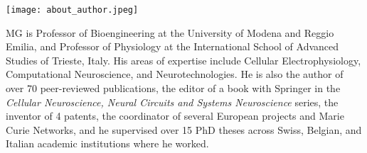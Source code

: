 %


\begin{center}
\texttt{[image: about\_author.jpeg]}
\end{center}	

	
	MG is Professor of Bioengineering at the University of Modena and Reggio Emilia, and Professor of Physiology at the International School of Advanced Studies of Trieste, Italy. His areas of expertise include Cellular Electrophysiology, Computational Neuroscience, and Neurotechnologies. He is also the author of over 70 peer-reviewed publications, the editor of a book with Springer in the \textit{Cellular Neuroscience, Neural Circuits and Systems Neuroscience} series, the inventor of 4 patents, the coordinator of several European projects and Marie Curie Networks, and he supervised over 15 PhD theses across Swiss, Belgian, and Italian academic institutions where he worked.